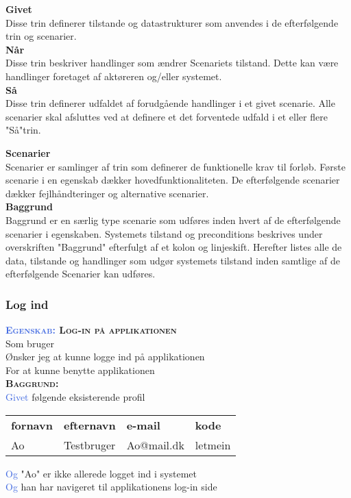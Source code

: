 \large{\textbf{Givet}}\\
Disse trin definerer tilstande og datastrukturer som anvendes i de 
efterfølgende trin og scenarier.\\
\large{\textbf{Når}}\\
Disse trin beskriver handlinger som ændrer Scenariets tilstand. Dette kan 
være handlinger	foretaget af aktøreren og/eller systemet.\\
\large{\textbf{Så}}\\
Disse trin definerer udfaldet af forudgående handlinger i et givet 
scenarie. Alle scenarier skal afsluttes ved at definere et det forventede 
udfald i et eller flere "Så"trin.\\

\clearpage

\large{\textbf{Scenarier}}\\
Scenarier er samlinger af trin som definerer de funktionelle krav til 
forløb. Første scenarie i en egenskab dækker hovedfunktionaliteten. De 
efterfølgende scenarier dækker fejlhåndteringer og alternative scenarier.\\
\large{\textbf{Baggrund}}\\
Baggrund er en særlig type scenarie som udføres inden hvert af de 
efterfølgende scenarier	i egenskaben. Systemets tilstand og preconditions 
beskrives under overskriften "Baggrund" efterfulgt af et kolon og 
linjeskift. Herefter listes alle de data, tilstande og handlinger som udgør 
systemets tilstand inden samtlige af de efterfølgende Scenarier kan	udføres.


\subsubsection{Log ind}
\textbf{\textsc{\textcolor{RoyalBlue} {Egenskab:} Log-in på applikationen}} \\
Som bruger\\
Ønsker jeg at kunne logge ind på applikationen\\
For at kunne benytte applikationen\\

\textbf{\textsc{\color{RoyalBlue}Baggrund:}}\\
\textcolor{RoyalBlue}{Givet} følgende eksisterende profil\\
\begin{tabular}{| l | l | l | l |}
	\textbf{fornavn} & \textbf{efternavn} & \textbf{e-mail} & \textbf{kode} \\
	Ao & Testbruger & Ao@mail.dk & letmein\\
\end{tabular}
\newline \newline
\textcolor{RoyalBlue}{Og} "Ao" er ikke allerede logget ind i systemet\\
\textcolor{RoyalBlue}{Og} han har navigeret til applikationens log-in side\\

